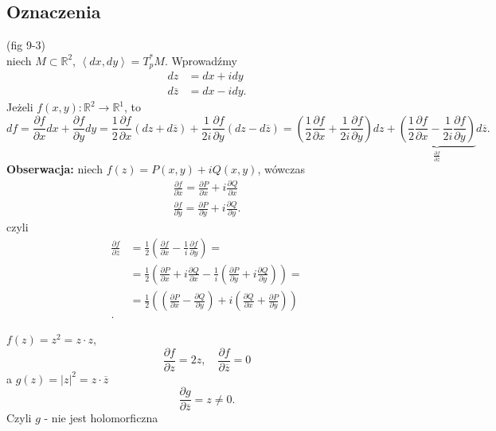\documentclass[../main.tex]{subfiles}
\begin{document}
    \subsection{Oznaczenia}
    (fig 9-3)\\
    niech $M\subset\mathbb{R}^2$, $\left<dx, dy \right> = T_p^* M$. Wprowadźmy
    \begin{align*}
        dz &= dx + idy\\
        d\overline{z} &= dx - idy
    .\end{align*}
    Jeżeli $f(x,y): \mathbb{R}^2\to \mathbb{R}^1$, to
    \[
        df = \frac{\partial f}{\partial x} dx + \frac{\partial f}{\partial y} dy = \frac{1}{2} \frac{\partial f}{\partial x} \left( dz + d\overline{z} \right) + \frac{1}{2i} \frac{\partial f}{\partial y} \left( dz - d\overline{z} \right) = \left( \frac{1}{2}\frac{\partial f}{\partial x} + \frac{1}{2i}\frac{\partial f}{\partial y}  \right) dz + \underbrace{\left( \frac{1}{2}\frac{\partial f}{\partial x} - \frac{1}{2i}\frac{\partial f}{\partial y}  \right)}_{\frac{\partial f}{\partial \overline{z}} }d\overline{z}
    .\]
\textbf{Obserwacja:} niech $f(z) = P(x,y) + i Q(x,y)$, wówczas
\begin{align*}
    \frac{\partial f}{\partial x} = \frac{\partial P}{\partial x} + i \frac{\partial Q}{\partial x} \\ \frac{\partial f}{\partial y} = \frac{\partial P}{\partial y} + i \frac{\partial Q}{\partial y}
.\end{align*}
czyli
\begin{align*}
    \frac{\partial f}{\partial \overline{z}} &= \frac{1}{2} \left( \frac{\partial f}{\partial x} - \frac{1}{i} \frac{\partial f}{\partial y}  \right) = \\
    &= \frac{1}{2} \left( \frac{\partial P}{\partial x} + i \frac{\partial Q}{\partial x} - \frac{1}{i}\left( \frac{\partial P}{\partial y} + i \frac{\partial Q}{\partial y}  \right)  \right)  =\\
    &= \frac{1}{2} \left(\left( \frac{\partial P}{\partial x}  - \frac{\partial Q}{\partial y}  \right) + i \left(\frac{\partial Q}{\partial x} + \frac{\partial P}{\partial y}\right)\right)  \\
.\end{align*}
\begin{przyklad}
    $f(z) = z^2 = z\cdot z$,\\
    \[
        \frac{\partial f}{\partial z} = 2z,\quad \frac{\partial f}{\partial \overline{z}} = 0
    \]
    a $g(z) = |z|^2 = z\cdot \overline{z}$
    \[
        \frac{\partial g}{\partial \overline{z}} = z \neq 0
    .\] Czyli $g$ - nie jest holomorficzna
\end{przyklad}
\end{document}
